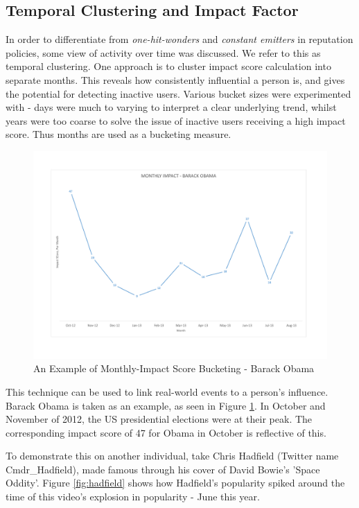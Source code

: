 \subsection{Temporal Clustering and Impact Factor}

In order to differentiate from \textit{one-hit-wonders} and \textit{constant emitters} in reputation policies, some view of activity over time was discussed. We refer to this as temporal clustering. One approach is to cluster impact score calculation into separate months. This reveals how consistently influential a person is, and gives the potential for detecting inactive users. Various bucket sizes were experimented with - days were much to varying to interpret a clear underlying trend, whilst years were too coarse to solve the issue of inactive users receiving a high impact score. Thus months are used as a bucketing measure.

\begin{figure}[h!]
\begin{center}
\centering
\includegraphics[width=500px]{Images/barack_obama_monthly_impact.pdf}
\caption{An Example of Monthly-Impact Score Bucketing - Barack Obama}
\label{fig:obama}
\end{center}
\end{figure}

This technique can be used to link real-world events to a person's influence. Barack Obama is taken as an example, as seen in Figure \ref{fig:obama}. In October and November of 2012, the US presidential elections were at their peak. The corresponding impact score of 47 for Obama in October is reflective of this. 

To demonstrate this on another individual, take Chris Hadfield (Twitter name Cmdr\_Hadfield), made famous through his cover of David Bowie's 'Space Oddity'. Figure \ref{fig:hadfield} shows how Hadfield's popularity spiked around the time of this video's explosion in popularity - June this year. 


